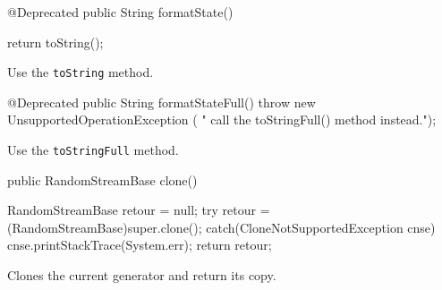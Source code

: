 \begin{code}

   @Deprecated
   public String formatState() \begin{hide} {
      return toString();
   }\end{hide}
\end{code}
\begin{tabb} Use the \texttt{toString} method.
\end{tabb}
\begin{hide}
\begin{code}

   @Deprecated
   public String formatStateFull() {
      throw new UnsupportedOperationException (
            "   call the toStringFull() method instead.");
   }\end{code}
\begin{tabb} Use the \texttt{toStringFull} method.
\end{tabb}
\end{hide}
\begin{code}

   public RandomStreamBase clone() \begin{hide} {
      RandomStreamBase retour = null;
      try {
         retour = (RandomStreamBase)super.clone();
      }
      catch(CloneNotSupportedException cnse) {
         cnse.printStackTrace(System.err);
      }
      return retour;
   }\end{hide}
   \end{code}
 \begin{tabb} Clones the current generator and return its copy.
 \end{tabb}
 \begin{htmlonly}
\end{htmlonly}
\begin{code}
\begin{hide}
}
\end{hide}
\end{code}
